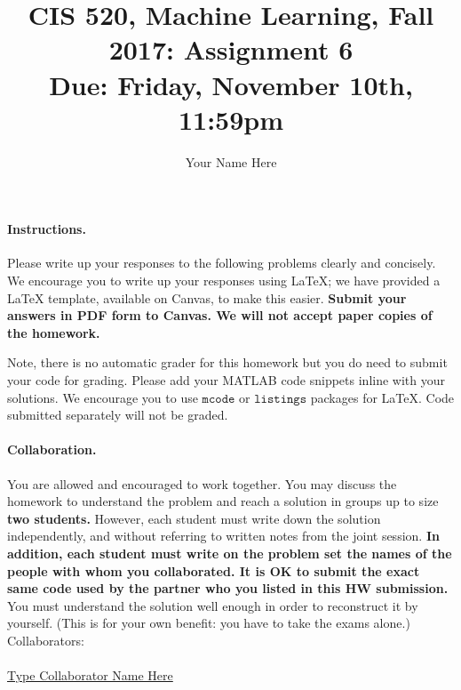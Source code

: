 \documentclass[english]{article}
\title{CIS 520, Machine Learning, Fall 2017: Assignment 6 \\
	Due: Friday, November 10th, 11:59pm \\
	\points{100}}
\date{}
\author{Your Name Here}
\begin{document}
\maketitle

\paragraph*{Instructions.} 
Please write up your responses to the following problems clearly and
concisely. 
We encourage you to write up your responses using \LaTeX{}; we have provided a \LaTeX{} template, available on Canvas, to make this easier. 
{\bf Submit your answers in PDF form to Canvas. 
	We will not accept paper copies of the homework.}

Note, there is no automatic grader for this homework but you do need to submit your code for grading. 
Please add your MATLAB code snippets inline with your solutions. We encourage you to use  \(\mathtt{mcode}\) or \(\mathtt{listings}\) packages for \LaTeX. Code submitted separately will not be graded.

\paragraph*{Collaboration.} 
You are allowed and encouraged to work together. You may discuss the homework to understand the problem and reach a solution in groups up to size {\bf two students.} 
However, each student must write down the solution independently, and without referring to written notes from the joint session. 
{\bf In addition, each student must write on the problem set the names of the people with whom you collaborated.
	It is OK to submit the exact same code used by the partner who you listed in this HW submission.}
You must understand the solution well enough in order to reconstruct it by yourself. (This is for your own benefit: you have to take the exams alone.) \\

{\normalsize \noindent Collaborators: \\
\\ \underline{ Type Collaborator Name Here        }}






\end{document}
